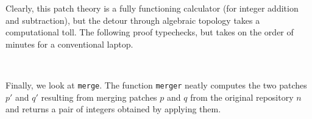 Clearly, this patch theory is a fully functioning calculator (for integer addition and subtraction),
but the detour through algebraic topology takes a computational toll.
The following proof typechecks, but takes on the order of minutes for a conventional laptop.
\begin{code}%
%
\>[2]\AgdaFunction{\AgdaUnderscore{}}\AgdaSpace{}%
\AgdaSymbol{:}\AgdaSpace{}%
\AgdaSpace{}%
\AgdaSymbol{(}\AgdaSpace{}%
\AgdaSymbol{)}\AgdaSpace{}%
\AgdaSpace{}%
\AgdaSpace{}%
\<%
\\
%
\>[2]\AgdaSymbol{\AgdaUnderscore{}}\AgdaSpace{}%
\AgdaSymbol{=}\AgdaSpace{}%
\<%
\end{code}


Finally, we look at \texttt{merge}. The function \texttt{merger} neatly computes the two patches
$p'$ and $q'$ resulting from merging patches $p$ and $q$ from the original repository $n$
and returns a pair of integers obtained by applying them.

